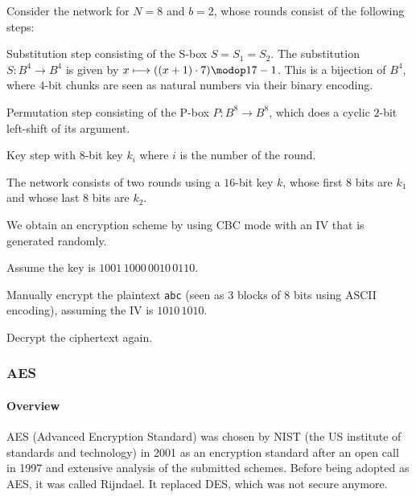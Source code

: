 \begin{exercise}\label{exc:sd:spn}
Consider the network for $N=8$ and $b=2$, whose rounds consist of the following steps:
\begin{compactenum}
 \item Substitution step consisting of the S-box $S=S_1=S_2$.
  The substitution $S:B^4\to B^4$ is given by $x\longmapsto ((x+1)\cdot 7)\modop 17-1$.
  This is a bijection of $B^4$, where $4$-bit chunks are seen as natural numbers via their binary encoding.
 \item Permutation step consisting of the P-box $P:B^8\to B^8$, which does a cyclic $2$-bit left-shift of its argument.
 \item Key step with $8$-bit key $k_i$ where $i$ is the number of the round.
\end{compactenum}
The network consists of two rounds using a $16$-bit key $k$, whose first $8$ bits are $k_1$ and whose last $8$ bits are $k_2$.

We obtain an encryption scheme by using CBC mode with an IV that is generated randomly.

Assume the key is $1001\,1000\,0010\,0110$.

Manually encrypt the plaintext \texttt{abc} (seen as $3$ blocks of $8$ bits using ASCII encoding), assuming the IV is $1010\,1010$.

Decrypt the ciphertext again.
\end{exercise}



\subsubsection{AES}


\paragraph{Overview}
AES (Advanced Encryption Standard) was chosen by NIST (the US institute of standards and technology) in 2001 as an encryption standard after an open call in 1997 and extensive analysis of the submitted schemes.
Before being adopted as AES, it was called Rijndael.
It replaced DES, which was not secure anymore.

